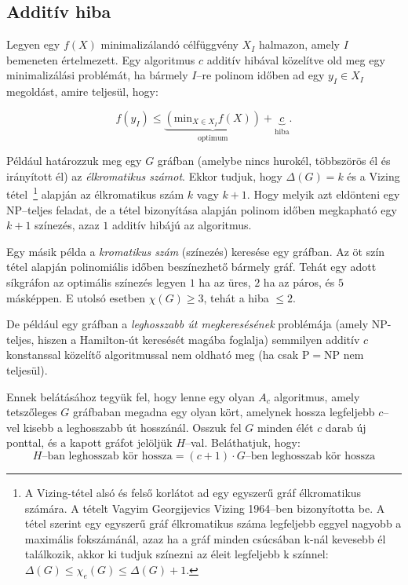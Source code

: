 \subsection{Additív hiba}

Legyen egy $f(X)$ minimalizálandó célfüggvény $X_I$ halmazon, amely $I$ bemeneten
értelmezett. Egy algoritmus $c$ additív hibával közelítve old meg egy minimalizálási
problémát, ha bármely $I$--re polinom időben ad egy $y_I \in X_I$ megoldást, amire teljesül, hogy:

\[
	f(y_I) \leq \underbrace{(\mbox{min}_{X \in X_I} f(X))}_{\mbox{optimum}} +
	\underbrace{c}_{\mbox{hiba}}.
\]

Például  határozzuk meg egy $G$ gráfban (amelybe nincs hurokél, többszörös él és
irányított él) az \emph{élkromatikus számot}. Ekkor tudjuk, hogy $\Delta(G)=k$ és a
Vizing tétel~\footnote{A Vizing-tétel alsó és felső korlátot ad egy egyszerű
	gráf élkromatikus számára. A tételt Vagyim Georgijevics Vizing 1964--ben
	bizonyította be. A tétel szerint egy egyszerű gráf élkromatikus száma legfeljebb
	eggyel nagyobb a maximális fokszámánál, azaz ha a gráf minden csúcsában k-nál
	kevesebb él találkozik, akkor ki tudjuk színezni az éleit legfeljebb k színnel:
	$\Delta(G) \leq \chi_e(G) \leq \Delta(G)+1.$}
alapján az élkromatikus szám $k$ vagy $k+1$. Hogy melyik azt
eldönteni egy NP--teljes feladat, de a tétel bizonyítása alapján polinom időben
megkapható egy $k+1$ színezés, azaz $1$ additív hibájú az algoritmus.

Egy másik példa a \emph{kromatikus szám} (színezés) keresése egy gráfban. Az öt szín
tétel alapján polinomiális időben beszínezhető bármely gráf. Tehát egy adott
síkgráfon az optimális színezés legyen $1$ ha az üres, $2$ ha az páros, és $5$
másképpen. E utolsó esetben $\chi(G) \geq 3$, tehát a hiba $\leq 2$.

De például egy gráfban a \emph{leghosszabb út megkeresésének} problémája (amely
NP-teljes, hiszen a Hamilton-út keresését magába foglalja) semmilyen additív $c$
konstanssal közelítő algoritmussal nem oldható meg (ha csak P$=$NP nem
teljesül).

Ennek belátásához tegyük fel, hogy lenne egy olyan $A_c$ algoritmus, amely
tetszőleges $G$ gráfbaban megadna egy olyan kört, amelynek hossza legfeljebb
$c$--vel kisebb a leghosszabb út hosszánál. Osszuk fel $G$ minden élét $c$ darab
új ponttal, és a kapott gráfot jelöljük $H$--val. Beláthatjuk, hogy:
\[ H\mbox{--ban leghosszab kör hossza} = (c+1) \cdot G\mbox{--ben leghosszab
		kör hossza} \]

